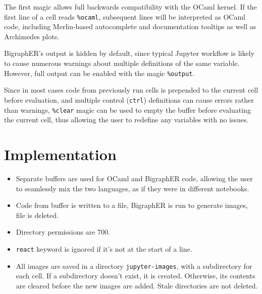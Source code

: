 \documentclass{article}
\begin{document}
The first magic allows full backwards compatibility with the OCaml kernel. If
the first line of a cell reads \texttt{\%ocaml}, subsequent lines will be
interpreted as OCaml code, including Merlin-based autocomplete and documentation
tooltips as well as Archimedes plots.

BigraphER's output is hidden by default, since typical Jupyter workflow is
likely to cause numerous warnings about multiple definitions of the same
variable. However, full output can be enabled with the magic \texttt{\%output}.

Since in most cases code from previously run cells is prepended to the current
cell before evaluation, and multiple control (\texttt{ctrl}) definitions can
cause errors rather than warnings, \texttt{\%clear} magic can be used to empty
the buffer before evaluating the current cell, thus allowing the user to
redefine any variables with no issues.

\section{Implementation}

\begin{itemize}
\item Separate buffers are used for OCaml and BigraphER code, allowing the user
  to seamlessly mix the two languages, as if they were in different notebooks.
\item Code from buffer is written to a file, BigraphER is run to generate
  images, file is deleted.
\item Directory permissions are $700$.
\item \texttt{react} keyword is ignored if it's not at the start of a line.
\item All images are saved in a directory \texttt{jupyter-images}, with a
  subdirectory for each cell. If a subdirectory doesn't exist, it is created.
  Otherwise, its contents are cleared before the new images are added. Stale
  directories are not deleted.
\end{itemize}
\end{document}
